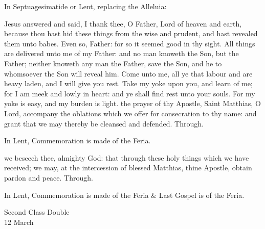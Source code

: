 \begin{rubric}
{In Septuagesimatide or Lent, replacing the Alleluia:}
\end{rubric}\par\noindent


 Jesus answered and said, I thank thee, O Father, Lord of heaven and earth, because thou hast hid these things from the wise and prudent, and hast revealed them unto babes. Even so, Father: for so it seemed good in thy sight. All things are delivered unto me of my Father: and no man knoweth the Son, but the Father; neither knoweth any man the Father, save the Son, and he to whomsoever the Son will reveal him. Come unto me, all ye that labour and are heavy laden, and I will give you rest. Take my yoke upon you, and learn of me; for I am meek and lowly in heart: and ye shall find rest unto your souls. For my yoke is easy, and my burden is light.
\secret
{} the prayer of thy Apostle, Saint Matthias, O Lord, accompany the oblations which we offer for consecration to thy name: and grant that we may thereby be cleansed and defended. Through.
\begin{rubric}
    In Lent, Commemoration is made of the Feria.%
\end{rubric}
\postcommunion
{} we beseech thee, almighty God: that through these holy things which we have received; we may, at the intercession of blessed Matthias, thine Apostle, obtain pardon and peace. Through.
\begin{rubric}
    In Lent, Commemoration is made of the Feria \& Last Gospel is of the Feria.
\end{rubric}

\clearpage
{}
\begin{inhead}
    {Second Class Double\\
12 March}
\end{inhead}

